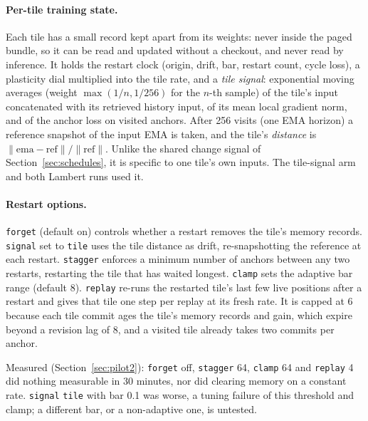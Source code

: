 \documentclass[10pt]{article}
\newcommand{\code}[1]{\texttt{#1}}
\begin{document}
\paragraph{Per-tile training state.} Each tile has a small record kept apart from its weights: never
inside the paged bundle, so it can be read and updated without a checkout, and never read by
inference. It holds the restart clock (origin, drift, bar, restart count, cycle loss), a plasticity
dial multiplied into the tile rate, and a \emph{tile signal}: exponential moving averages (weight
$\max(1/n, 1/256)$ for the $n$-th sample) of the tile's input concatenated with its retrieved history
input, of its mean local gradient norm, and of the anchor loss on visited anchors. After 256 visits
(one EMA horizon) a reference snapshot of the input EMA is taken, and the tile's \emph{distance} is
$\lVert \text{ema}-\text{ref}\rVert/\lVert\text{ref}\rVert$. Unlike the shared change signal of
Section~\ref{sec:schedules}, it is specific to one tile's own inputs. The tile-signal arm and both
Lambert runs used it.

\paragraph{Restart options.} \code{forget} (default on) controls whether a restart removes the tile's
memory records. \code{signal} set to \code{tile} uses the tile distance as drift, re-snapshotting the reference at
each restart. \code{stagger} enforces a minimum number of anchors between any two restarts, restarting
the tile that has waited longest. \code{clamp} sets the adaptive bar range (default 8).
\code{replay} re-runs the restarted tile's last few live positions after a restart and gives that tile
one step per replay at its fresh rate. It is capped at 6 because each tile commit ages the tile's
memory records and gain, which expire beyond a revision lag of 8, and a visited tile already takes
two commits per anchor.

Measured (Section~\ref{sec:pilot2}): \code{forget} off, \code{stagger} 64, \code{clamp} 64 and
\code{replay} 4 did nothing measurable in 30 minutes, nor did clearing memory on a constant rate.
\code{signal} \code{tile} with bar 0.1 was worse, a tuning failure of this threshold and clamp; a
different bar, or a non-adaptive one, is untested.
\end{document}

